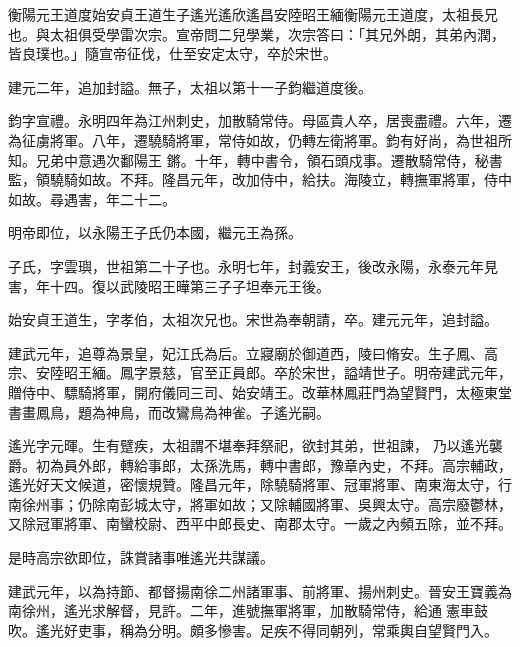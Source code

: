 
\begin{pinyinscope}

 衡陽元王道度始安貞王道生子遙光遙欣遙昌安陸昭王緬衡陽元王道度，太祖長兄也。與太祖俱受學雷次宗。宣帝問二兒學業，次宗答曰：「其兄外朗，其弟內潤，皆良璞也。」隨宣帝征伐，仕至安定太守，卒於宋世。



 建元二年，追加封謚。無子，太祖以第十一子鈞繼道度後。



 鈞字宣禮。永明四年為江州刺史，加散騎常侍。母區貴人卒，居喪盡禮。六年，遷為征虜將軍。八年，遷驍騎將軍，常侍如故，仍轉左衛將軍。鈞有好尚，為世祖所知。兄弟中意遇次鄱陽王
 鏘。十年，轉中書令，領石頭戍事。遷散騎常侍，秘書監，領驍騎如故。不拜。隆昌元年，改加侍中，給扶。海陵立，轉撫軍將軍，侍中如故。尋遇害，年二十二。



 明帝即位，以永陽王子氏仍本國，繼元王為孫。



 子氏，字雲璵，世祖第二十子也。永明七年，封義安王，後改永陽，永泰元年見害，年十四。復以武陵昭王曄第三子子坦奉元王後。



 始安貞王道生，字孝伯，太祖次兄也。宋世為奉朝請，卒。建元元年，追封謚。



 建武元年，追尊為景皇，妃江氏為后。立寢廟於御道西，陵曰脩安。生子鳳、高宗、安陸昭王緬。鳳字景慈，官至正員郎。卒於宋世，謚靖世子。明帝建武元年，贈侍中、驃騎將軍，開府儀同三司、始安靖王。改華林鳳莊門為望賢門，太極東堂書畫鳳鳥，題為神鳥，而改鸞鳥為神雀。子遙光嗣。



 遙光字元暉。生有躄疾，太祖謂不堪奉拜祭祀，欲封其弟，世祖諫，
 乃以遙光襲爵。初為員外郎，轉給事郎，太孫洗馬，轉中書郎，豫章內史，不拜。高宗輔政，遙光好天文候道，密懷規贊。隆昌元年，除驍騎將軍、冠軍將軍、南東海太守，行南徐州事；仍除南彭城太守，將軍如故；又除輔國將軍、吳興太守。高宗廢鬱林，又除冠軍將軍、南蠻校尉、西平中郎長史、南郡太守。一歲之內頻五除，並不拜。



 是時高宗欲即位，誅賞諸事唯遙光共謀議。



 建武元年，以為持節、都督揚南徐二州諸軍事、前將軍、揚州刺史。晉安王寶義為南徐州，遙光求解督，見許。二年，進號撫軍將軍，加散騎常侍，給通憲車鼓吹。遙光好吏事，稱為分明。頗多慘害。足疾不得同朝列，常乘輿自望賢門入。




\end{pinyinscope}
